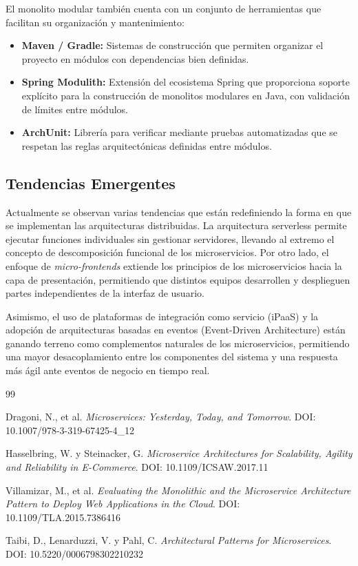 \documentclass[12pt,a4paper]{article}
\begin{document}
El monolito modular también cuenta con un conjunto de herramientas que facilitan su organización y mantenimiento:

\begin{itemize}
\item \textbf{Maven / Gradle:} Sistemas de construcción que permiten organizar el proyecto en módulos con dependencias bien definidas.
\item \textbf{Spring Modulith:} Extensión del ecosistema Spring que proporciona soporte explícito para la construcción de monolitos modulares en Java, con validación de límites entre módulos.
\item \textbf{ArchUnit:} Librería para verificar mediante pruebas automatizadas que se respetan las reglas arquitectónicas definidas entre módulos.
\end{itemize}

\subsection{Tendencias Emergentes}

Actualmente se observan varias tendencias que están redefiniendo la forma en que se implementan las arquitecturas distribuidas. La arquitectura serverless permite ejecutar funciones individuales sin gestionar servidores, llevando al extremo el concepto de descomposición funcional de los microservicios. Por otro lado, el enfoque de \textit{micro-frontends} extiende los principios de los microservicios hacia la capa de presentación, permitiendo que distintos equipos desarrollen y desplieguen partes independientes de la interfaz de usuario.

Asimismo, el uso de plataformas de integración como servicio (iPaaS) y la adopción de arquitecturas basadas en eventos (Event-Driven Architecture) están ganando terreno como complementos naturales de los microservicios, permitiendo una mayor desacoplamiento entre los componentes del sistema y una respuesta más ágil ante eventos de negocio en tiempo real.

\begin{thebibliography}{99}

Dragoni, N., et al.
\textit{Microservices: Yesterday, Today, and Tomorrow}.
DOI: 10.1007/978-3-319-67425-4\_12

Hasselbring, W. y Steinacker, G.
\textit{Microservice Architectures for Scalability, Agility and Reliability in E-Commerce}.
DOI: 10.1109/ICSAW.2017.11

Villamizar, M., et al.
\textit{Evaluating the Monolithic and the Microservice Architecture Pattern to Deploy Web Applications in the Cloud}.
DOI: 10.1109/TLA.2015.7386416

Taibi, D., Lenarduzzi, V. y Pahl, C.
\textit{Architectural Patterns for Microservices}.
DOI: 10.5220/0006798302210232

\end{thebibliography}
\end{document}
